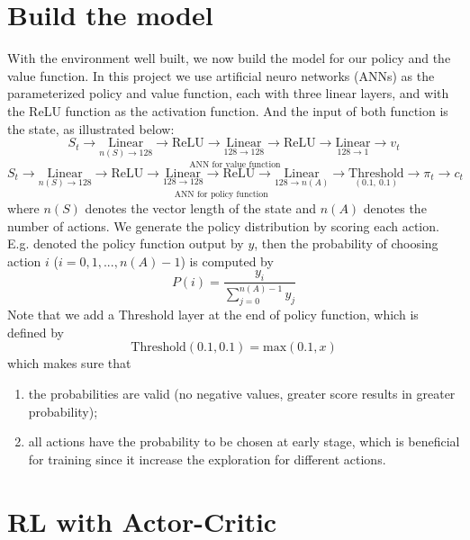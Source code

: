 \documentclass[11pt]{article}
\begin{document}
\section{Build the model}
With the environment well built, we now build the model for our policy and the
value function. In this project we use artificial neuro networks (ANNs) as the 
parameterized policy and value function, each with three linear layers, and 
with the ReLU function as the activation function. And the input of both 
function is the state, as illustrated below:
\[S_t\rightarrow\underset{\text{ANN for value function}}{
        \boxed{
            \underset{n(S)\rightarrow 128}{\text{Linear}}
            \rightarrow\text{ReLU}
            \rightarrow\underset{128\rightarrow 128}{\text{Linear}}
            \rightarrow\text{ReLU}
            \rightarrow\underset{128\rightarrow 1}{\text{Linear}}
        }
}\rightarrow v_t\]
\[S_t\rightarrow\underset{\text{ANN for policy function}}{
        \boxed{
            \underset{n(S)\rightarrow 128}{\text{Linear}}
            \rightarrow\text{ReLU}
            \rightarrow\underset{128\rightarrow 128}{\text{Linear}}
            \rightarrow\text{ReLU}
            \rightarrow\underset{128\rightarrow n(A)}{\text{Linear}}
            \rightarrow\underset{(0.1, \: 0.1)}{\text{Threshold}}
        }
}\rightarrow \pi_t\rightarrow c_t\]
where \(n(S)\) denotes the vector length of the state and \(n(A)\) denotes 
the number of actions. 
\vspace{3mm}\newline We generate the policy distribution by scoring each 
action. E.g. denoted the policy function output by \(y\), then the probability 
of choosing action \(i\) (\(i=0, 1, ..., n(A) - 1\)) is computed by 
\[P(i)=\frac{y_i}{\sum_{j=0}^{n(A)-1} y_j}\]
Note that we add a Threshold layer at the end of policy 
function, which is defined by 
\[\text{Threshold}(0.1, 0.1)=\text{max}(0.1, x)\]
which makes sure that 
\begin{enumerate}
    \item the probabilities are valid (no negative values, greater score 
        results in greater probability);
    \item all actions have the probability to be chosen at early stage, which 
        is beneficial for training since it increase the exploration for 
        different actions.
\end{enumerate}

\section{RL with Actor-Critic}
\end{document}
